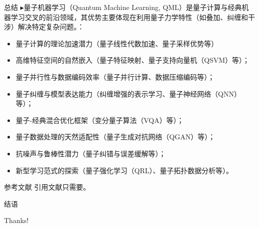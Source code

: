 \documentclass{beamer}
\begin{document}
\begin{frame}{总结}
    $\blacktriangleright$量子机器学习（Quantum Machine Learning, QML）是量子计算与经典机器学习交叉的前沿领域，其优势主要体现在利用量子力学特性（如叠加、纠缠和干涉）解决特定复杂问题。：
    \begin{itemize}
        \small
        \pause
        \item<1-> 量子计算的理论加速潜力（量子线性代数加速、量子采样优势等）
        \pause
        \item<2-> 高维特征空间的自然嵌入（量子特征映射、量子支持向量机（QSVM）等）；
        \pause
        \item<3-> 量子并行性与数据编码效率（量子并行计算、数据压缩编码等）；
        \pause
        \item<4-> 量子纠缠与模型表达能力（纠缠增强的表示学习、量子神经网络（QNN）等）；
        \pause
        \item<5-> 量子-经典混合优化框架（变分量子算法（VQA）等）；
        \pause
        \item<6-> 量子数据处理的天然适配性（量子生成对抗网络（QGAN）等）；
        \pause
        \item<7-> 抗噪声与鲁棒性潜力（量子纠错与误差缓解等）；
        \pause
        \item<8-> 新型学习范式的探索（量子强化学习（QRL）、量子拓扑数据分析等）。
    \end{itemize}
\end{frame}

\begin{frame}{参考文献}
    \printbibliography[title = 参考文献]
    引用文献只需要\cite{shor1994algorithms}。
\end{frame}

\begin{frame}{结语}
	\begin{center}
    {\Huge\calligra Thanks!}
  \end{center}
\end{frame}
\end{document}
